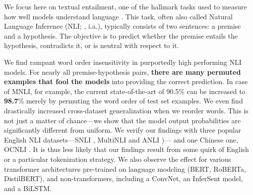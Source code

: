 \documentclass[12pt]{article}
\begin{document}
\begin{table}
    \centering
    \small
    \caption{Examples from the MNLI Matched development set. Both the original example and the permuted one elicit the same classification label (entailment and contradiction respectively) from RoBERTa (large).}
    \label{tab:example}
\end{table}



We focus here on textual entailment, one of the hallmark tasks used to measure how well models understand language \cite{condoravdi-etal-2003-entailment, dagan-etal-2005-pascal}. This task, often also called Natural Language Inference (NLI; \cite{bowman-etal-2015-large}, i.a.), typically consists of two sentences: a premise and a hypothesis. The objective is to predict whether the premise entails the hypothesis, contradicts it, or is neutral with respect to it.

We find rampant word order insensitivity in purportedly high performing NLI models. For nearly all premise-hypothesis pairs, \textbf{there are many permuted examples that fool the models} into providing the correct prediction. In case of MNLI, for example, the current state-of-the-art of 90.5\% can be increased to \textbf{98.7}\% merely by permuting the word order of test set examples. We even find drastically increased cross-dataset generalization when we reorder words. This is not just a matter of chance---we show that the model output probabilities are significantly different from uniform.
We verify our findings with three popular English NLI datasets---SNLI \citep{bowman-etal-2015-large}, MultiNLI \citep{williams-etal-2018-broad} and ANLI \citep{nie-etal-2020-adversarial})---
and one Chinese one, OCNLI \cite{hu-etal-2020-ocnli}. It is thus less likely that our findings result from some quirk of English or a particular tokenization strategy.
We also observe the effect for various transformer architectures pre-trained on language modeling (BERT, RoBERTa, DistilBERT), and non-transformers, including a ConvNet, an InferSent model, and a BiLSTM.
\end{document}
